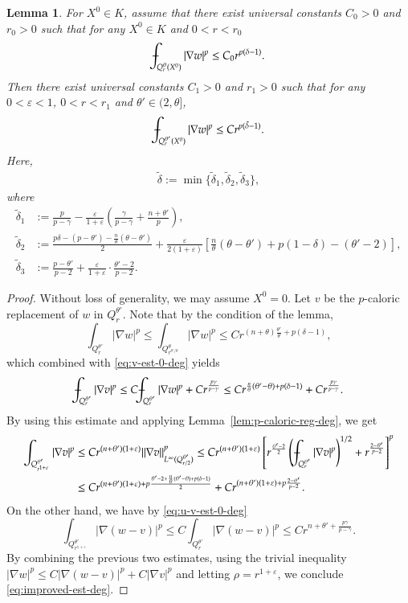 \documentclass[11pt,oneside,english]{amsart}
\newcommand{\e}{\varepsilon}
\newcommand{\de}{\delta}
\newcommand{\D}{\nabla}
\numberwithin{equation}{section}
\def\Xint#1{\mathchoice
  {\XXint\displaystyle\textstyle{#1}}%
  {\XXint\textstyle\scriptstyle{#1}}%
  {\XXint\scriptstyle\scriptscriptstyle{#1}}%
  {\XXint\scriptscriptstyle\scriptscriptstyle{#1}}%
  \!\int}
\def\XXint#1#2#3{{\setbox0=\hbox{$#1{#2#3}{\int}$}
    \vcenter{\hbox{$#2#3$}}\kern-.5\wd0}}
\def\dashint{\Xint-}
\theoremstyle{plain}
\newtheorem{lemma}{Lemma}
\numberwithin{equation}{section}
\begin{document}
\begin{lemma}
    \label{lem:iter-deg-1}
    For $X^0\in K$, assume that there exist universal constants $C_0>0$ and $r_0>0$ such that for any $X^0\in K$ and $0<r<r_0$
    $$
    \dashint_{Q_r^\theta(X^0)}|\D w|^p\le C_0r^{p(\de-1)}.
    $$
    Then there exist universal constants $C_1>0$ and $r_1>0$ such that for any $0<\e<1$, $0<r<r_1$ and $\theta'\in(2,\theta]$,
    \begin{align}
        \label{eq:improved-est-deg}
        \dashint_{Q_r^{\theta'}(X^0)}|\D w|^p\le Cr^{p(\tilde\de-1)}.
    \end{align}
Here, 
\begin{align}
    \label{eq:degree-deg}
    \tilde\de:=\min\{\tilde\de_1,\tilde\de_2,\tilde\de_3\},
\end{align}
where
\begin{align*}
    \tilde\de_1&:=\frac{p}{p-\gamma}-\frac{\e}{1+\e}\left(\frac{\gamma}{p-\gamma}+\frac{n+\theta'}{p}\right),\\
    \tilde\de_2&:=\frac{p\de-(p-\theta')-\frac{n}{\theta}(\theta-\theta') }2+\frac{\e}{2(1+\e)}\left[\frac n\theta(\theta-\theta')+p(1-\de)-(\theta'-2) \right],\\
    \tilde\de_3&:=\frac{p-\theta'}{p-2}+\frac{\e}{1+\e}\cdot\frac{\theta'-2}{p-2}.
\end{align*}
\end{lemma}


\begin{proof}
Without loss of generality, we may assume $X^0=0$. Let $v$ be the $p$-caloric replacement of $w$ in $Q_r^{\theta'}$. Note that by the condition of the lemma,
$$
\int_{Q_r^{\theta'}}|\D w|^p\le \int_{Q^\theta_{r^{\theta'/\theta}}}|\D w|^p\le Cr^{(n+\theta)\frac{\theta'}\theta+p(\de-1) },
$$
which combined with \eqref{eq:v-est-0-deg} yields
$$
\dashint_{Q_r^{\theta'}}|\D v|^p\le C\dashint_{Q_r^{\theta'}}|\D w|^p+Cr^{\frac{p\gamma}{p-\gamma}}\le Cr^{\frac{n}\theta(\theta'-\theta)+p(\de-1)}+Cr^{\frac{p\gamma}{p-\gamma}}.
$$
By using this estimate and applying Lemma~\ref{lem:p-caloric-reg-deg}, we get
\begin{align*}
    \int_{Q_{r^{1+\e}}^{\theta'}}|\D v|^p&\le Cr^{(n+\theta')(1+\e)}\|\D v\|_{L^\infty(Q_{r/2}^{\theta'} )}^p\le Cr^{(n+\theta')(1+\e)}\left[r^{\frac{\theta'-2}2}\left(\dashint_{Q_r^{\theta'}}|\D v|^p\right)^{1/2}+r^{\frac{2-\theta'}{p-2}} \right]^p\\
    &\le Cr^{(n+\theta')(1+\e)+p\frac{\theta'-2+\frac n\theta(\theta'-\theta)+p(\de-1) }2 }+Cr^{(n+\theta')(1+\e)+p\frac{2-\theta'}{p-2} }.
\end{align*}
On the other hand, we have by \eqref{eq:u-v-est-0-deg}
$$
\int_{Q_{r^{1+\e}}^{\theta'}}|\D(w-v)|^p\le C\int_{Q_r^{\theta'}}|\D(w-v)|^p\le Cr^{n+\theta'+\frac{p\gamma}{p-\gamma}}.
$$
By combining the previous two estimates, using the trivial inequality $|\D w|^p\le C|\D(w-v)|^p+C|\D v|^p$ and letting $\rho=r^{1+\e}$, we conclude \eqref{eq:improved-est-deg}.    
\end{proof}
\end{document}
